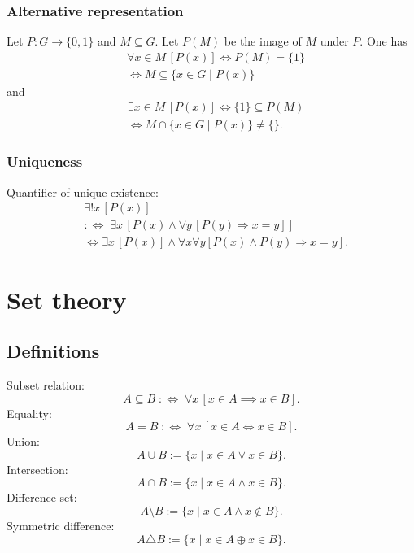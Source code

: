 \subsubsection{Alternative representation}
Let $P\colon G\to\{0,1\}$ and $M\subseteq G$.
Let $P(M)$ be the image of $M$ under $P$. One has
\begin{equation}
\begin{split}
&\forall x{\in}M\,[P(x)] \iff P(M)=\{1\}\\
& \iff M\subseteq\{x{\in}G\mid P(x)\}
\end{split}
\end{equation}
and
\begin{equation}
\begin{split}
& \exists x{\in}M\,[P(x)] \iff \{1\}\subseteq P(M)\\
& \iff M\cap\{x{\in}G\mid P(x)\}\ne\{\}.
\end{split}
\end{equation}

\subsubsection{Uniqueness}
Quantifier of unique existence:
\begin{equation}
\begin{split}
&\exists!x\,[P(x)]\\
&:\Longleftrightarrow\; \exists x\,[P(x)\land \forall y\,[P(y)\Rightarrow x=y]]\\
&\iff \exists x\,[P(x)]\land \forall x\forall y[P(x)\land P(y)\Rightarrow x=y].
\end{split}
\end{equation}



\section{Set theory}
\subsection{Definitions}
Subset relation:
\begin{equation}
A\subseteq B\;:\Longleftrightarrow\; \forall x\,[x\in A\implies x\in B].
\end{equation}
Equality:
\begin{equation}
A=B\;:\Longleftrightarrow\; \forall x\,[x\in A\iff x\in B].
\end{equation}
Union:
\begin{equation}
A\cup B:=\{x\mid x\in A\lor x\in B\}.
\end{equation}
Intersection:
\begin{equation}
A\cap B:=\{x\mid x\in A\land x\in B\}.
\end{equation}
Difference set:
\begin{equation}
A\setminus B:=\{x\mid x\in A\land x\not\in B\}.
\end{equation}
Symmetric difference:
\begin{equation}
A\triangle B:=\{x\mid x\in A\oplus x\in B\}.
\end{equation}

